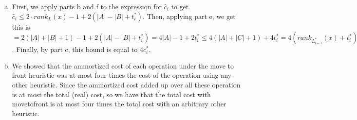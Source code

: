 \documentclass{article}
\begin{document}
\begin{enumerate}[a.]
\item
First, we apply parts b and f to the expression for $\hat{c}_i$ to get $\hat{c}_i \le 2\cdot rank_{L}(x) -1 + 2(|A|-|B|+t_i^*)$. Then, applying part e, we get this is $= 2(|A|+|B|+1) - 1+ 2(|A|-|B|+t_i^*) = 4|A| -1+2t_i^*\le 4(|A|+|C|+1) +4t_i^* = 4(rank_{L_{i-1}^*}(x) + t_i^*)$. Finally, by part c, this bound is equal to $4c_i^*$.
\item
We showed that the ammortized cost of each operation under the move to front heuristic was at most four times the cost of the operation using any other heuristic. Since the ammortized cost added up over all these operation is at most the total (real) cost, so we have that the total cost with movetofront is at most four times the total cost with an arbitrary other heuristic.

\end{enumerate}
\end{document}
